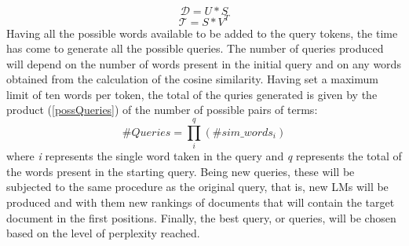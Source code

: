 \begin{equation}\label{matrixD}
    \mathcal{D} = U*S
\end{equation}
\begin{equation}\label{matrixT}
    \mathcal{T} = S*V^T
\end{equation}
Having all the possible words available to be added to the query tokens, the 
time has come to generate all the possible queries. The number of queries 
produced will depend on the number of words present in the initial query and 
on any words obtained from the calculation of the cosine similarity. Having 
set a maximum limit of ten words per token, the total of the quries generated 
is given by the product (\ref{possQueries}) of the number of possible pairs of terms: 
\begin{equation}\label{possQueries}
    \#Queries = \prod_i^q (\#sim\_words_i)
\end{equation}
where \emph{i} represents the single word taken in the query and \emph{q} represents the 
total of the words present in the starting query. Being new queries, these 
will be subjected to the same procedure as the original query, that is, new 
LMs will be produced and with them new rankings of documents that will 
contain the target document in the first positions. Finally, the best query, 
or queries, will be chosen based on the level of perplexity reached.